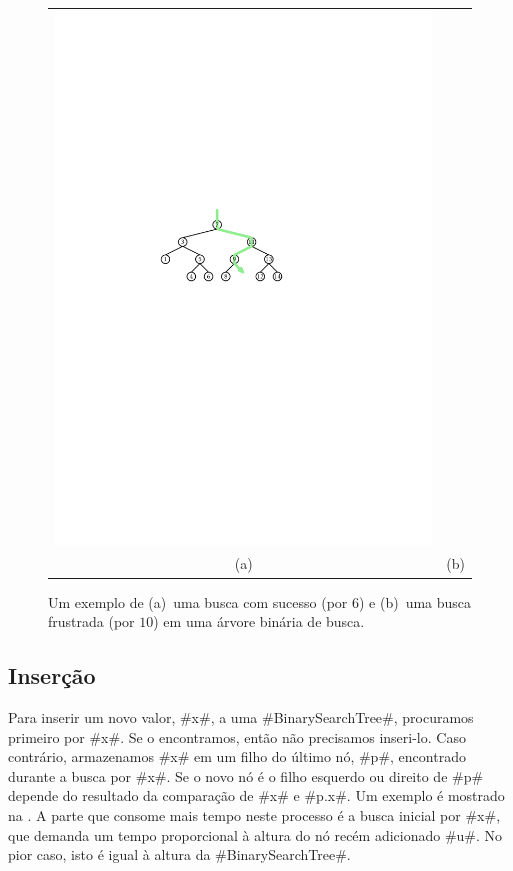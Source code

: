 \begin{figure}
\begin{center}
\begin{tabular}{cc}
    \includegraphics[width=\HalfScaleIfNeeded]{figs/bst-example-3} \\
    (a) & (b)
    \end{tabular}
  \end{center}
  \caption{Um exemplo de (a)~uma busca com sucesso (por $6$) e (b)~uma busca frustrada (por $10$) em uma árvore binária de busca.}
\end{figure}


\subsection{Inserção}

Para inserir um novo valor, #x#, a uma #BinarySearchTree#, procuramos primeiro por #x#. Se o encontramos, então não precisamos inseri-lo.  Caso contrário, armazenamos #x# em um filho do último nó, #p#, encontrado durante a busca por #x#. Se o novo nó é o filho esquerdo ou direito de #p# depende do resultado da comparação de #x# e #p.x#.
Um exemplo é mostrado na . A parte que consome mais tempo neste processo é a busca inicial por #x#, que demanda um tempo proporcional à altura do nó recém adicionado #u#.
No pior caso, isto é igual à altura da #BinarySearchTree#.


